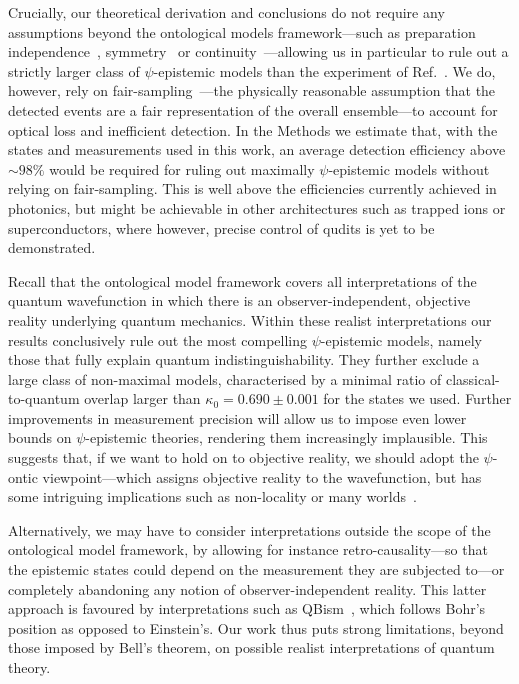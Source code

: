 \documentclass[aps,prl,floatfix,onecolumn,tightenlines,amsmath,amssymb,nofootinbib,12pt]{revtex4-2}
\begin{document}
Crucially, our theoretical derivation and conclusions do not require any assumptions beyond the ontological models framework---such as preparation independence~\cite{Pusey2012,Nigg2012}, symmetry~\cite{Aaronson2013} or continuity~\cite{hardy2013are,Patra2013no-,Patra2013}---allowing us in particular to rule out a strictly larger class of $\psi$-epistemic models than the experiment of Ref.~\cite{Nigg2012}.
We do, however, rely on fair-sampling~\cite{larsson2014loopholes,RevModPhys.86.419}---the physically reasonable assumption that the detected events are a fair representation of the overall ensemble---to account for optical loss and inefficient detection.
In the Methods we estimate that, with the states and measurements used in this work, an average detection efficiency above $\sim 98 \%$ would be required for ruling out maximally $\psi$-epistemic models without relying on fair-sampling. This is well above the efficiencies currently achieved in photonics, but might be achievable in other architectures such as trapped ions or superconductors, where however, precise control of qudits is yet to be demonstrated.

Recall that the ontological model framework covers all interpretations of the quantum wavefunction in which there is an observer-independent, objective reality underlying quantum mechanics. Within these realist interpretations our results conclusively rule out the most compelling $\psi$-epistemic models, namely those that fully explain quantum indistinguishability. 
They further exclude a large class of non-maximal models, characterised by a minimal ratio of classical-to-quantum overlap larger than $\kappa_0{=}0.690\pm 0.001$ 
for the states we used. Further improvements in measurement precision will allow us to impose even lower bounds on $\psi$-epistemic theories, rendering them increasingly implausible. This suggests that, if we want to hold on to objective reality, we should adopt the $\psi$-ontic viewpoint---which assigns objective reality to the wavefunction, but has some intriguing implications such as non-locality or many worlds~\cite{everett1957relative}.

Alternatively, we may have to consider interpretations outside the scope of the ontological model framework, by allowing for instance retro-causality---so that the epistemic states could depend on the measurement they are subjected to---or completely abandoning any notion of observer-independent reality. This latter approach is favoured by interpretations such as QBism~\cite{caves2002quantum,Fuchs2010,mermin2000QBism}, which follows Bohr's position as opposed to Einstein's.
Our work thus puts strong limitations, beyond those imposed by Bell's theorem, on possible realist interpretations of quantum theory.
\end{document}

